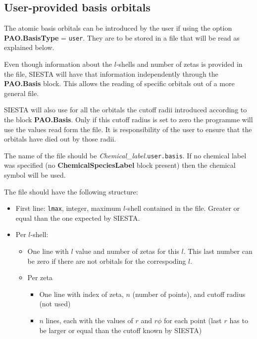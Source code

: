 \subsection{User-provided basis orbitals}

The atomic basis orbitals can be introduced by the user if using
the option {\bf PAO.BasisType} = {\tt user}. They are to be stored in
a file that will be read as explained below. 

Even though information
about the $l$-shells and number of zetas is provided in the file,
SIESTA will have that information independently through the
{\bf PAO.Basis} block.
This allows the reading of specific orbitals
out of a more general file.

SIESTA will also use for all
the orbitals the cutoff radii introduced 
according to the block {\bf PAO.Basis}. Only if 
this cutoff radius is set to zero the programme will use 
the values read form the file.
It is responsibility of the user to ensure that the orbitals have
died out by those radii.

The name of the file should be {\it Chemical\_label.}{\tt user.basis}.
If no chemical label was specified (no {\bf ChemicalSpeciesLabel} block
present) then the chemical symbol will be used.
 
The file should have the following structure:

\begin{itemize}
\item First line: {\tt lmax}, integer, maximum $l$-shell contained in 
the file. Greater or equal than the one expected by SIESTA.
\item Per $l$-shell: 
\begin{itemize}
\item One line with $l$ value and number of zetas for this $l$. 
This last number can be zero if there are not orbitals for the correspoding $l$.
\item Per zeta
\begin{itemize}
\item One line with index of zeta, $n$ (number of points), and cutoff radius 
(not used)
\item $n$ lines, each with the values of $r$ and $r \phi$ for each point
(last $r$ has to be larger or equal than the cutoff known by SIESTA) 
\end{itemize}
\end{itemize}
\end{itemize}


